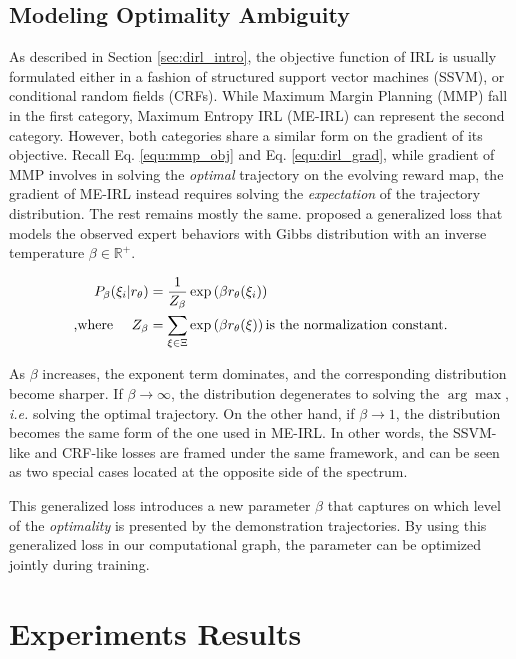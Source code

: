 \documentclass[../thesis.tex]{subfiles}
\begin{document}
\subsection{Modeling Optimality Ambiguity}

As described in Section \ref{sec:dirl_intro}, the objective function of IRL is usually formulated either in a fashion of structured support vector machines (SSVM), or conditional random fields (CRFs). 
While Maximum Margin Planning (MMP) fall in the first category, Maximum Entropy IRL (ME-IRL) can represent the second category. 
However, both categories share a similar form on the gradient of its objective. 
Recall Eq. \ref{equ:mmp_obj} and Eq. \ref{equ:dirl_grad}, while gradient of MMP involves in solving the \textit{optimal} trajectory on the evolving reward map, the gradient of ME-IRL instead requires solving the \textit{expectation} of the trajectory distribution. 
The rest remains mostly the same.
\citet{pletscher2010entropy} proposed a generalized loss that models the observed expert behaviors with Gibbs distribution with an inverse temperature $\beta \in \mathbb R^{+}$. 

\begin{align}
P_{\beta}(\xi_i | r_\theta) &= \frac{1}{Z_\beta} \exp \left( \beta r_\theta(\xi_i) \right) \\
\text{,where \quad} Z_\beta &= \sum_{\xi \in \Xi} \exp \left( \beta r_\theta(\xi) \right) \text{is the normalization constant.}
\end{align}

As $\beta$ increases, the exponent term dominates, and the corresponding distribution become sharper. 
If $\beta \to \infty$, the distribution degenerates to solving the $\arg\max$, \textit{i.e.} solving the optimal trajectory. 
On the other hand, if $\beta \to 1$, the distribution becomes the same form of the one used in ME-IRL.
In other words, the SSVM-like and CRF-like losses are framed under the same framework, and can be seen as two special cases located at the opposite side of the spectrum. 

This generalized loss introduces a new parameter $\beta$ that captures on which level of the \textit{optimality} is presented by the demonstration trajectories. By using this generalized loss in our computational graph, the parameter can be optimized jointly during training.

\section{Experiments Results}
\end{document}
